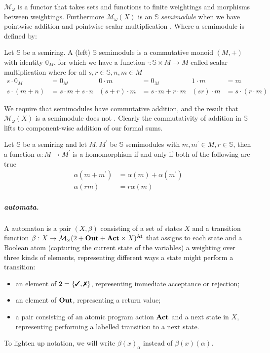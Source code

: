 \documentclass[a4paper,UKenglish,cleveref, autoref, thm-restate]{lipics-v2021}
\newcommand{\cmark}{\text{\ding{51}}}
\newcommand{\xmark}{\text{\ding{55}}}
\newcommand{\Out}{\textbf{\upshape{Out}}}
\newcommand{\Act}{\textbf{\upshape{Act}}}
\newcommand{\At}{\text{\upshape{At}}}
\newcommand{\Mon}{\mathcal{M}_\omega}
\newcommand{\wgkat}{\textsf{\upshape{wGKAT}}\xspace}
\theoremstyle{plain}\newtheoremrep{thm}{Theorem}[section]
\begin{document}
	\begin{toappendix}
		
		$\Mon$ is a functor \cite{10.1007/978-3-030-30942-8_18} that takes sets and functions to finite weightings and morphisms between weightings. Furthermore $\Mon(X)$ is an $\mathbb S$ \textit{semimodule} when we have pointwise addition and pointwise scalar multiplication \cite{vanheerdt2021learningweightedautomataprincipal}. Where a semimodule is defined by:
		\begin{defn}\label{semimodule}
			Let $\mathbb S$ be a semiring. A (left) $\mathbb S$ semimodule is a commutative monoid $(M, +)$ with identity $0_M$, for which we have a function $\cdot: \mathbb S \times M \to M$ called scalar multiplication where for all $s,r \in \mathbb S, n,m \in M$
			\begin{align*}
				s\cdot 0_M &= 0_M &  0\cdot m &= 0_M &  1\cdot m &= m \\
				s\cdot(m+n) &= s\cdot m+s\cdot n &  (s+r)\cdot m &= s\cdot m+r\cdot m&  (sr)\cdot m &= s\cdot (r\cdot m) 
			\end{align*}
		\end{defn}	
		
		We require that semimodules have commutative addition, and the result that $\Mon(X)$ is a semimodule  does not \cite{vanheerdt2021learningweightedautomataprincipal}. Clearly the commutativity of addition in $\mathbb S$ lifts to component-wise addition of our formal sums. 		
		
		\begin{defn}\label{smhom}
			Let $\mathbb S$ be a semiring and let $M, M^\prime$ be $\mathbb S$ semimodules with $m, m^\prime \in M, r \in \mathbb S$, then a function $\alpha:M \to M^\prime$ is a homomorphism if and only if both of the following are true
			\begin{align*}
				\alpha(m+m^\prime) &= \alpha (m) + \alpha (m^\prime)\\
				\alpha(rm) &= r \alpha (m)
			\end{align*}
		\end{defn}
			
	\end{toappendix}
			
	\subparagraph*{\wgkat automata.} A \wgkat automaton is a pair $(X, \beta)$ consisting of a set of states $X$ and a transition function $\beta: X\to \Mon(2+\Out+\Act\times X)^{\At}$ that assigns to each state and a Boolean atom (capturing the current state of the variables) a weighting over three kinds of elements, representing different ways a state might perform a transition: 
	\begin{itemize}
	\item an element of $2 = \{\cmark, \xmark\}$, representing immediate acceptance or rejection;
	\item an element of  $\Out$, representing a return value;
	\item a pair consisting of an atomic program action $\Act$ and a next state in $X$, representing performing a labelled transition to a next state. 
	\end{itemize}
	To lighten up notation, we will write $\beta(x)_\alpha$ instead of $\beta(x)(\alpha)$.
\end{document}
